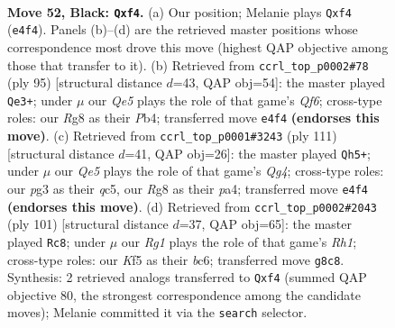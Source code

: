 \documentclass[11pt]{article}
\begin{document}
\clearpage

\begin{figure}[p]\centering
\begin{subfigure}{0.46\textwidth}\centering
\resizebox{\linewidth}{!}{%
\newchessgame
\chessboard[
  setfen={6r1/8/5p2/3p1k2/4qP2/Q5P1/P6P/6K1 b - - 0 52},
  showmover=false,
  pgfstyle=straightmove, color=movearrow, markmove={e4-f4}
]}
\caption{}
\end{subfigure}\hfill
\begin{subfigure}{0.46\textwidth}\centering
\resizebox{\linewidth}{!}{%
\newchessgame
\chessboard[
  setfen={8/6Q1/4pP2/p7/1p3kP1/5q2/7P/6K1 b - - 14 48},
  showmover=false,
  pgfstyle=straightmove, color=movearrow, markmove={f3-e3}
]}
\caption{}
\end{subfigure}
\\[4pt]
\begin{subfigure}{0.46\textwidth}\centering
\resizebox{\linewidth}{!}{%
\newchessgame
\chessboard[
  setfen={8/7p/5p1k/p1Q2Pq1/P7/5K2/5P2/8 b - - 2 56},
  showmover=false,
  pgfstyle=straightmove, color=movearrow, markmove={g5-h5}
]}
\caption{}
\end{subfigure}\hfill
\begin{subfigure}{0.46\textwidth}\centering
\resizebox{\linewidth}{!}{%
\newchessgame
\chessboard[
  setfen={7r/6k1/2B1Pq2/1pQ2Pp1/6P1/8/5PK1/8 b - - 10 51},
  showmover=false,
  pgfstyle=straightmove, color=movearrow, markmove={h8-c8}
]}
\caption{}
\end{subfigure}
\caption{\textbf{Move 52, Black: \texttt{Qxf4}.} (a) Our position; Melanie plays \texttt{Qxf4} (\texttt{e4f4}). Panels (b)--(d) are the retrieved master positions whose correspondence most drove this move (highest QAP objective among those that transfer to it). (b) Retrieved from \texttt{ccrl\_top\_p0002\#78} (ply 95) [structural distance $d$=43, QAP obj=54]: the master played \texttt{Qe3+}; under $\mu$ our \emph{Qe5} plays the role of that game's \emph{Qf6}; cross-type roles: our \emph{R}g8 as their \emph{P}b4; transferred move \texttt{e4f4} \textbf{(endorses this move)}. (c) Retrieved from \texttt{ccrl\_top\_p0001\#3243} (ply 111) [structural distance $d$=41, QAP obj=26]: the master played \texttt{Qh5+}; under $\mu$ our \emph{Qe5} plays the role of that game's \emph{Qg4}; cross-type roles: our \emph{p}g3 as their \emph{q}c5, our \emph{R}g8 as their \emph{p}a4; transferred move \texttt{e4f4} \textbf{(endorses this move)}. (d) Retrieved from \texttt{ccrl\_top\_p0002\#2043} (ply 101) [structural distance $d$=37, QAP obj=65]: the master played \texttt{Rc8}; under $\mu$ our \emph{Rg1} plays the role of that game's \emph{Rh1}; cross-type roles: our \emph{K}f5 as their \emph{b}c6; transferred move \texttt{g8c8}. Synthesis: 2 retrieved analogs transferred to \texttt{Qxf4} (summed QAP objective 80, the strongest correspondence among the candidate moves); Melanie committed it via the \texttt{search} selector.}
\label{fig:thought-m103}
\end{figure}
\end{document}
